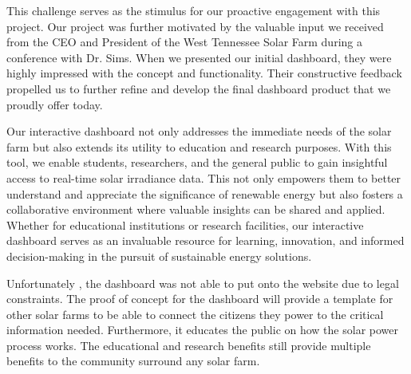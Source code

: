 \documentclass{sigchi}
\begin{document}
This challenge serves as the stimulus for our proactive engagement with this project. Our project was further motivated by the valuable input we received from the CEO and President of the West Tennessee Solar Farm during a conference with Dr. Sims. When we presented our initial dashboard, they were highly impressed with the concept and functionality. Their constructive feedback propelled us to further refine and develop the final dashboard product that we proudly offer today.

Our interactive dashboard not only addresses the immediate needs of the solar farm but also extends its utility to education and research purposes. With this tool, we enable students, researchers, and the general public to gain insightful access to real-time solar irradiance data. This not only empowers them to better understand and appreciate the significance of renewable energy but also fosters a collaborative environment where valuable insights can be shared and applied. Whether for educational institutions or research facilities, our interactive dashboard serves as an invaluable resource for learning, innovation, and informed decision-making in the pursuit of sustainable energy solutions.

Unfortunately , the dashboard was not able to put onto the website due to legal constraints. The proof of concept for the dashboard will provide a template for other solar farms to be able to connect the citizens they power to the critical information needed. Furthermore, it educates the public on how the solar power process works. The educational and research benefits still provide multiple benefits to the community surround any solar farm.
\end{document}
